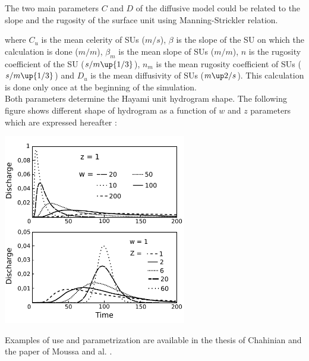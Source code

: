 The two main parameters $C$ and $D$ of the diffusive model could be related to the slope and the rugosity of the surface unit using Manning-Strickler relation.



where $C_u$ is the mean celerity of SUs ($m/s$), $\beta$ is the slope of the SU on which the calculation is done ($m/m$), $\beta_m$ is the mean slope of SUs ($m/m$), $n$ is the rugosity coefficient of the SU ($s/m\up{1/3}$), $n_m$ is the mean rugosity coefficient of SUs ($s/m\up{1/3}$) and $D_u$ is the mean diffusivity of SUs ($m\up2/s$). This calculation is done only once at the beginning of the simulation.\\

Both parameters determine the Hayami unit hydrogram shape. The following figure shows different shape of hydrogram as a function of $w$ and $z$ parameters which are expressed hereafter :


\includegraphics[width=8cm]{common/Graphique_noyau_Hayami.pdf}

Examples of use and parametrization are available in the thesis of Chahinian \cite{Chahinian2004} and the paper of Moussa and al. \cite{Moussa2002}.\\
